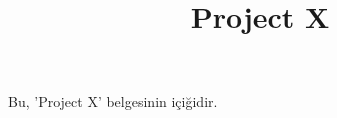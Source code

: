 \documentclass[a4paper,11pt]{article}
\title{Project X}
\author{}
\date{}
\begin{document}
\maketitle

Bu, 'Project X' belgesinin içiğidir.
\end{document}
